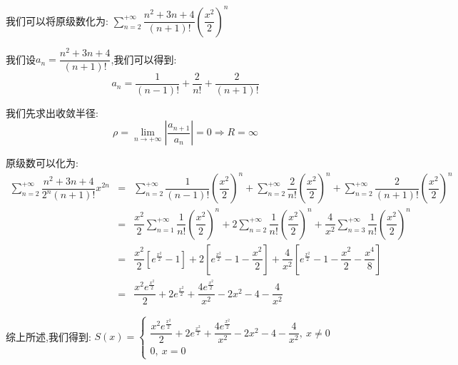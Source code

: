 \begin{solution}

	我们可以将原级数化为:  $\sum\limits_{n=2}^{+\infty}\dfrac{n^2+3n+4}{(n+1)!}(\dfrac{x^2}{2})^{n}$
	
	我们设$a_{n}=\dfrac{n^2+3n+4}{(n+1)!}$,我们可以得到:  
	$$a_{n}=\dfrac{1}{(n-1)!}+\dfrac{2}{n!}+\dfrac{2}{(n+1)!}$$
	
	我们先求出收敛半径:  
	$$\rho=\lim\limits_{n\to +\infty}|\dfrac{a_{n+1}}{a_{n}}|=0\Rightarrow R=\infty$$
	
	原级数可以化为:  
	\begin{eqnarray*}
		\sum\limits_{n=2}^{+\infty}\dfrac{n^2+3n+4}{2^n(n+1)!}x^{2n}&=&\sum\limits_{n=2}^{+\infty}\dfrac{1}{(n-1)!}(\dfrac{x^2}{2})^{n}+\sum\limits_{n=2}^{+\infty}\dfrac{2}{n!}(\dfrac{x^2}{2})^{n}+\sum\limits_{n=2}^{+\infty}\dfrac{2}{(n+1)!}(\dfrac{x^2}{2})^{n}\\
		&=&\dfrac{x^2}{2}\sum\limits_{n=1}^{+\infty}\dfrac{1}{n!}(\dfrac{x^2}{2})^{n}+2\sum\limits_{n=2}^{+\infty}\dfrac{1}{n!}(\dfrac{x^2}{2})^{n}+\dfrac{4}{x^2}\sum\limits_{n=3}^{+\infty}\dfrac{1}{n!}(\dfrac{x^2}{2})^{n}\\
		&=&\dfrac{x^2}{2}\left[e^{\frac{x^2}{2}}-1\right]+2\left[e^{\frac{x^2}{2}}-1-\dfrac{x^2}{2}\right]+\dfrac{4}{x^2}\left[ e^{\frac{x^2}{2}}-1-\dfrac{x^2}{2}-\dfrac{x^4}{8}\right]\\
		&=&\dfrac{x^2e^{\frac{x^2}{2}}}{2}+2e^{\frac{x^2}{2}}+\dfrac{4e^{\frac{x^2}{2}}}{x^2}-2x^2-4-\dfrac{4}{x^2}   
	\end{eqnarray*}

	综上所述,我们得到:  $S(x)=\left\lbrace
	\begin{array}{l}
		\dfrac{x^2e^{\frac{x^2}{2}}}{2}+2e^{\frac{x^2}{2}}+\dfrac{4e^{\frac{x^2}{2}}}{x^2}-2x^2-4-\dfrac{4}{x^2},\ x\neq 0\\
		0,\ x=0
	\end{array}
	\right. $
\end{solution}


